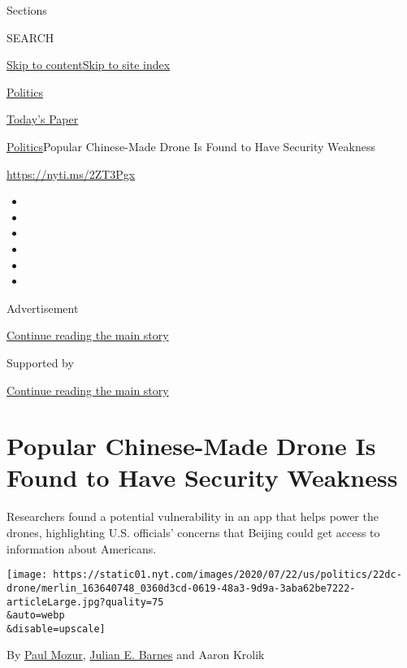 Sections

SEARCH

\protect\hyperlink{site-content}{Skip to
content}\protect\hyperlink{site-index}{Skip to site index}

\href{https://www.nytimes.com/section/politics}{Politics}

\href{https://myaccount.nytimes.com/auth/login?response_type=cookie\&client_id=vi}{}

\href{https://www.nytimes.com/section/todayspaper}{Today's Paper}

\href{/section/politics}{Politics}\textbar{}Popular Chinese-Made Drone
Is Found to Have Security Weakness

\url{https://nyti.ms/2ZT3Pgx}

\begin{itemize}
\item
\item
\item
\item
\item
\item
\end{itemize}

Advertisement

\protect\hyperlink{after-top}{Continue reading the main story}

Supported by

\protect\hyperlink{after-sponsor}{Continue reading the main story}

\hypertarget{popular-chinese-made-drone-is-found-to-have-security-weakness}{%
\section{Popular Chinese-Made Drone Is Found to Have Security
Weakness}\label{popular-chinese-made-drone-is-found-to-have-security-weakness}}

Researchers found a potential vulnerability in an app that helps power
the drones, highlighting U.S. officials' concerns that Beijing could get
access to information about Americans.

\texttt{[image: https://static01.nyt.com/images/2020/07/22/us/politics/22dc-drone/merlin\_163640748\_0360d3cd-0619-48a3-9d9a-3aba62be7222-articleLarge.jpg?quality=75\\\&auto=webp\\\&disable=upscale]}

By \href{https://www.nytimes.com/by/paul-mozur}{Paul Mozur},
\href{https://www.nytimes.com/by/julian-e-barnes}{Julian E. Barnes} and
Aaron Krolik

